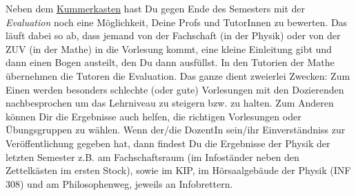 \newpage{}
\label{eval}

\noindent Neben dem \hyperref[kummerkasten]{Kummerkasten} hast Du gegen Ende des
Semesters mit der \emph{Evaluation} noch eine Möglichkeit, Deine Profs und
TutorInnen zu bewerten. Das läuft dabei so ab, dass jemand von der Fachschaft
(in der Physik) oder von der ZUV (in der Mathe) in die Vorlesung kommt, eine
kleine Einleitung gibt und dann einen Bogen austeilt, den Du dann ausfüllst. In
den Tutorien der Mathe übernehmen die Tutoren die Evaluation.  Das ganze dient
zweierlei Zwecken: Zum Einen werden besonders schlechte (oder gute) Vorlesungen
mit den Dozierenden nachbesprochen um das Lehrniveau zu steigern bzw. zu
halten. Zum Anderen können Dir die Ergebnisse auch helfen, die richtigen
Vorlesungen oder Übungsgruppen zu wählen. Wenn der/die DozentIn sein/ihr
Einverständniss zur Veröffentlichung gegeben hat, dann findest Du die
Ergebnisse der Physik der letzten Semester z.B. am Fachschaftsraum (im
Infoständer neben den Zettelkästen im ersten Stock), sowie im \gls{KIP}, im
Hörsaalgebäude der Physik (\Gls{INF} 308) und am Philosophenweg, jeweils an
Infobrettern.
